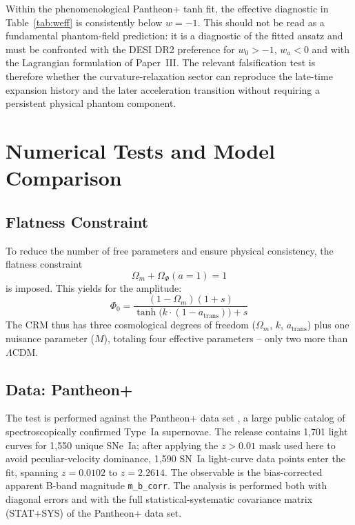 \documentclass[aps,prd,twocolumn,superscriptaddress,nofootinbib]{revtex4-2}
\begin{document}
Within the phenomenological Pantheon+ tanh fit, the effective diagnostic in Table~\ref{tab:weff} is consistently below $w=-1$. This should not be read as a fundamental phantom-field prediction: it is a diagnostic of the fitted ansatz and must be confronted with the DESI DR2 preference for $w_0>-1$, $w_a<0$ and with the Lagrangian formulation of Paper~III. The relevant falsification test is therefore whether the curvature-relaxation sector can reproduce the late-time expansion history and the later acceleration transition without requiring a persistent physical phantom component.


\section{Numerical Tests and Model Comparison}
\label{sec:numerics}


\subsection{Flatness Constraint}
\label{subsec:flatness}

To reduce the number of free parameters and ensure physical consistency, the flatness constraint
\begin{equation}
\Omega_m + \Omega_\Phi(a{=}1) = 1
\label{eq:flatness}
\end{equation}
is imposed. This yields for the amplitude:
\begin{equation}
\Phi_0 = \frac{(1 - \Omega_m)(1 + s)}{\tanh\!\big(k\cdot(1 - a_{\mathrm{trans}})\big) + s}
\end{equation}
The CRM thus has three cosmological degrees of freedom ($\Omega_m$, $k$, $a_{\mathrm{trans}}$) plus one nuisance parameter ($M$), totaling four effective parameters -- only two more than $\Lambda$CDM.

\subsection{Data: Pantheon+}
\label{subsec:pantheonplus}

The test is performed against the Pantheon+ data set \cite{Scolnic2022}, a large public catalog of spectroscopically confirmed Type~Ia supernovae. The release contains 1,701 light curves for 1,550 unique SNe~Ia; after applying the $z > 0.01$ mask used here to avoid peculiar-velocity dominance, 1,590 SN~Ia light-curve data points enter the fit, spanning $z = 0.0102$ to $z = 2.2614$. The observable is the bias-corrected apparent B-band magnitude \texttt{m\_b\_corr}. The analysis is performed both with diagonal errors and with the full statistical-systematic covariance matrix (STAT+SYS) of the Pantheon+ data set.
\end{document}
